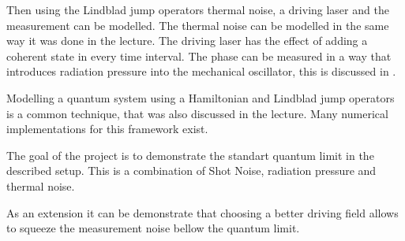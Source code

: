 \documentclass[
	a4page,
	parskip=full,
]{scrartcl}
\begin{document}
Then using the Lindblad jump operators thermal noise, a driving laser and the measurement can be modelled.
The thermal noise can be modelled in the same way it was done in the lecture.
The driving laser has the effect of adding a coherent state in every time interval.
The phase can be measured in a way that introduces radiation pressure into the mechanical oscillator, this is discussed in \autocite{aspelmeyer_cavity_2014}.

Modelling a quantum system using a Hamiltonian and Lindblad jump operators is a common technique, that was also discussed in the lecture.
Many numerical implementations for this framework exist.

The goal of the project is to demonstrate the standart quantum limit in the described setup.
This is a combination of Shot Noise, radiation pressure and thermal noise.

As an extension it can be demonstrate that choosing a better driving field allows to squeeze the measurement noise bellow the quantum limit.


\printbibliography
\end{document}
